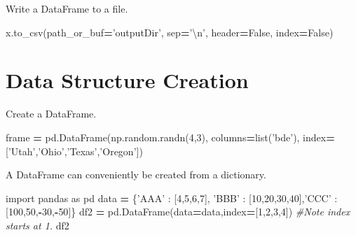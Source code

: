\documentclass[]{book}
\newenvironment{Shaded}{\begin{snugshade}}{\end{snugshade}}
\newcommand{\BuiltInTok}[1]{#1}
\newcommand{\CharTok}[1]{\textcolor[rgb]{0.31,0.60,0.02}{#1}}
\newcommand{\CommentTok}[1]{\textcolor[rgb]{0.56,0.35,0.01}{\textit{#1}}}
\newcommand{\DecValTok}[1]{\textcolor[rgb]{0.00,0.00,0.81}{#1}}
\newcommand{\ImportTok}[1]{#1}
\newcommand{\NormalTok}[1]{#1}
\newcommand{\OperatorTok}[1]{\textcolor[rgb]{0.81,0.36,0.00}{\textbf{#1}}}
\newcommand{\StringTok}[1]{\textcolor[rgb]{0.31,0.60,0.02}{#1}}
\newcommand{\VariableTok}[1]{\textcolor[rgb]{0.00,0.00,0.00}{#1}}
\begin{document}
Write a DataFrame to a file.

\begin{Shaded}
\begin{Highlighting}[]
\NormalTok{x.to_csv(path_or_buf}\OperatorTok{=}\StringTok{'outputDir'}\NormalTok{, sep}\OperatorTok{=}\StringTok{'}\CharTok{\textbackslash{}n}\StringTok{'}\NormalTok{, header}\OperatorTok{=}\VariableTok{False}\NormalTok{, index}\OperatorTok{=}\VariableTok{False}\NormalTok{)}
\end{Highlighting}
\end{Shaded}

\hypertarget{data-structure-creation}{%
\section{Data Structure Creation}\label{data-structure-creation}}

Create a DataFrame.

\begin{Shaded}
\begin{Highlighting}[]
\NormalTok{frame }\OperatorTok{=}\NormalTok{ pd.DataFrame(np.random.randn(}\DecValTok{4}\NormalTok{,}\DecValTok{3}\NormalTok{), columns}\OperatorTok{=}\BuiltInTok{list}\NormalTok{(}\StringTok{'bde'}\NormalTok{), index}\OperatorTok{=}\NormalTok{[}\StringTok{'Utah'}\NormalTok{,}\StringTok{'Ohio'}\NormalTok{,}\StringTok{'Texas'}\NormalTok{,}\StringTok{'Oregon'}\NormalTok{])}
\end{Highlighting}
\end{Shaded}

A DataFrame can conveniently be created from a dictionary.

\begin{Shaded}
\begin{Highlighting}[]
\ImportTok{import}\NormalTok{ pandas }\ImportTok{as}\NormalTok{ pd}
\NormalTok{data }\OperatorTok{=}\NormalTok{ \{}\StringTok{'AAA'}\NormalTok{ : [}\DecValTok{4}\NormalTok{,}\DecValTok{5}\NormalTok{,}\DecValTok{6}\NormalTok{,}\DecValTok{7}\NormalTok{], }\StringTok{'BBB'}\NormalTok{ : [}\DecValTok{10}\NormalTok{,}\DecValTok{20}\NormalTok{,}\DecValTok{30}\NormalTok{,}\DecValTok{40}\NormalTok{],}\StringTok{'CCC'}\NormalTok{ : [}\DecValTok{100}\NormalTok{,}\DecValTok{50}\NormalTok{,}\OperatorTok{-}\DecValTok{30}\NormalTok{,}\OperatorTok{-}\DecValTok{50}\NormalTok{]\}}
\NormalTok{df2 }\OperatorTok{=}\NormalTok{ pd.DataFrame(data}\OperatorTok{=}\NormalTok{data,index}\OperatorTok{=}\NormalTok{[}\DecValTok{1}\NormalTok{,}\DecValTok{2}\NormalTok{,}\DecValTok{3}\NormalTok{,}\DecValTok{4}\NormalTok{]) }\CommentTok{#Note index starts at 1.}
\NormalTok{df2}
\end{Highlighting}
\end{Shaded}
\end{document}
